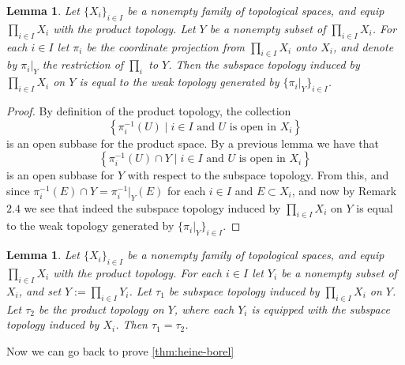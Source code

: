 \documentclass[11pt,a4paper]{article}
\theoremstyle{definition}
\theoremstyle{plain}
\newtheorem{lemma}[theorem]{Lemma}
\newcommand{\set}[2]{ \left\{ #1 \mid #2 \right\} }
\begin{document}
  \begin{lemma}
    Let $\{X_i\}_{i \in I}$ be a nonempty family of topological spaces, 
    and equip $\prod_{i \in I}{X_i}$ with the product topology. Let $Y$ be 
    a nonempty subset of $\prod_{i \in I}{X_i}$. For each $i \in I$ let 
    $\pi_i$ be the coordinate projection from $\prod_{i \in I}{X_i}$ onto 
    $X_i$, and denote by $\pi_i\vert_Y$ the restriction of $\prod_i$ to $Y$.
    Then the subspace topology induced by $\prod_{i \in I}{X_i}$ on $Y$ is 
    equal to the weak topology generated by $\{\pi_i \vert_Y\}_{i \in I}$.
  \end{lemma}
  \begin{proof}
    By definition of the product topology, the collection
    \[
      \set{\pi_{i}^{-1}(U)}{\text{$i \in I$ and $U$ is open in $X_i$}}
    \]
    is an open subbase for the product space. By a previous lemma
    we have that
    \[
      \set{\pi_{i}^{-1}(U) \cap Y}
      {\text{$i \in I$ and $U$ is open in $X_i$}}
    \]
    is an open subbase for $Y$ with respect to the subspace topology.
    From this, and since $\pi_{i}^{-1}(E) \cap Y = \pi_{i}^{-1} \vert_Y(E)$
    for each $i \in I$ and $E \subset X_i$, and now by Remark $2.4$ we
    see that indeed the subspace topology induced by $\prod_{i \in I}{X_i}$ 
    on $Y$ is equal to the weak topology generated by 
    $\{\pi_i \vert_Y\}_{i \in I}$.
  \end{proof}

  \begin{lemma}
    Let $\{X_i\}_{i \in I}$ be a nonempty family of topological spaces, 
    and equip $\prod_{i \in I}{X_i}$ with the product topology. For each 
    $i \in I$ let $Y_i$ be a nonempty subset of $X_i$, and set 
    $Y := \prod_{i \in I}{Y_i}$. Let $\tau_1$ be subspace topology induced 
    by $\prod_{i \in I}{X_i}$ on $Y$. Let $\tau_2$ be the product topology 
    on $Y$, where each $Y_i$ is equipped with the subspace topology induced 
    by $X_i$. Then $\tau_1 = \tau_2$.
  \end{lemma}

  Now we can go back to prove \ref{thm:heine-borel}
\end{document}
